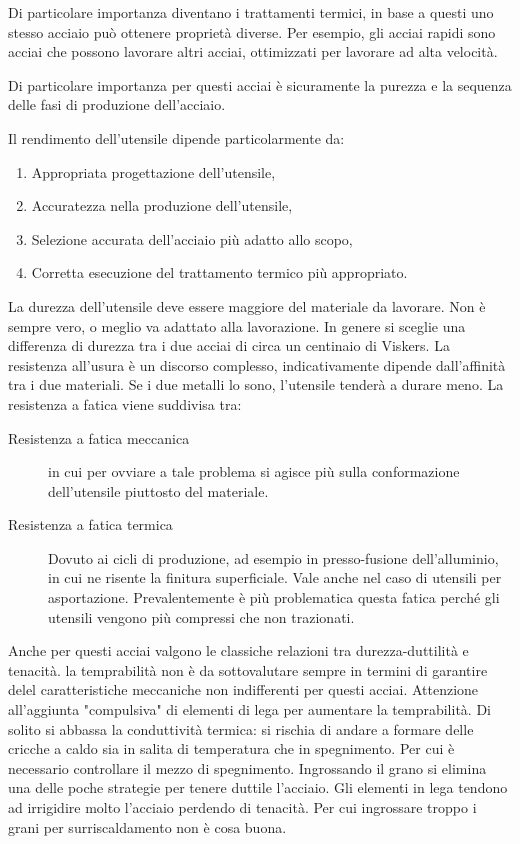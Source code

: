 Di particolare importanza diventano i trattamenti termici, in base a questi uno stesso acciaio può ottenere proprietà diverse.
Per esempio, gli acciai rapidi sono acciai che possono lavorare altri acciai, ottimizzati per lavorare ad alta velocità.

Di particolare importanza per questi acciai è sicuramente la purezza e la sequenza delle fasi di produzione dell'acciaio.

Il rendimento dell'utensile dipende particolarmente da:
\begin{enumerate}
\item Appropriata progettazione dell'utensile,
\item Accuratezza nella produzione dell'utensile,
\item Selezione accurata dell'acciaio più adatto allo scopo,
\item Corretta esecuzione del trattamento termico più appropriato.
\end{enumerate}


La durezza dell'utensile deve essere maggiore del materiale da lavorare. Non è sempre vero, o meglio va adattato alla lavorazione. In genere si sceglie una differenza di durezza tra i due acciai di circa un centinaio di Viskers.
La resistenza all'usura è un discorso complesso, indicativamente dipende dall'affinità tra i due materiali. Se i due metalli lo sono, l'utensile tenderà a durare meno.
La resistenza a fatica viene suddivisa tra:
\begin{description}
\item[Resistenza a fatica meccanica] in cui per ovviare a tale problema si agisce più sulla conformazione dell'utensile piuttosto del materiale.
\item[Resistenza a fatica termica] Dovuto ai cicli di produzione, ad esempio in presso-fusione dell'alluminio, in cui ne risente la finitura superficiale. Vale anche nel caso di utensili per asportazione. Prevalentemente è più problematica questa fatica perché gli utensili vengono più compressi che non trazionati.
\end{description}
Anche per questi acciai valgono le classiche relazioni tra durezza-duttilità e tenacità.
la temprabilità non è da sottovalutare sempre in termini di garantire delel caratteristiche meccaniche non indifferenti per questi acciai.
Attenzione all'aggiunta "compulsiva" di elementi di lega per aumentare la temprabilità. Di solito si abbassa la conduttività termica: si rischia di andare a formare delle cricche a caldo sia in salita di temperatura che in spegnimento. Per cui è necessario controllare il mezzo di spegnimento.
Ingrossando il grano si elimina una delle poche strategie per tenere duttile l'acciaio. Gli elementi in lega tendono ad irrigidire molto l'acciaio perdendo di tenacità. Per cui ingrossare troppo i grani per surriscaldamento non è cosa buona.

